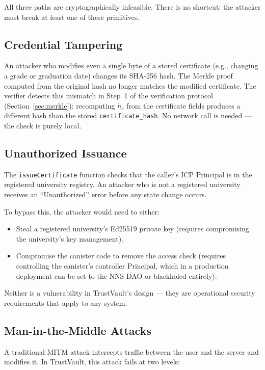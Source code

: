 \documentclass[journal]{IEEEtran}
\begin{document}
All three paths are cryptographically infeasible. There is no shortcut: the attacker must break at least one of these primitives.

\subsection{Credential Tampering}

An attacker who modifies even a single byte of a stored certificate (e.g., changing a grade or graduation date) changes its SHA-256 hash. The Merkle proof computed from the original hash no longer matches the modified certificate. The verifier detects this mismatch in Step~1 of the verification protocol (Section~\ref{sec:merkle}): recomputing $h_c$ from the certificate fields produces a different hash than the stored \texttt{certificate\_hash}. No network call is needed — the check is purely local.

\subsection{Unauthorized Issuance}

The \texttt{issueCertificate} function checks that the caller's ICP Principal is in the registered university registry. An attacker who is not a registered university receives an ``Unauthorized'' error before any state change occurs.

To bypass this, the attacker would need to either:
\begin{itemize}[leftmargin=*]
  \item Steal a registered university's Ed25519 private key (requires compromising the university's key management).
  \item Compromise the canister code to remove the access check (requires controlling the canister's controller Principal, which in a production deployment can be set to the NNS DAO or blackholed entirely).
\end{itemize}

Neither is a vulnerability in TrustVault's design — they are operational security requirements that apply to any system.

\subsection{Man-in-the-Middle Attacks}

A traditional MITM attack intercepts traffic between the user and the server and modifies it. In TrustVault, this attack fails at two levels:
\end{document}
